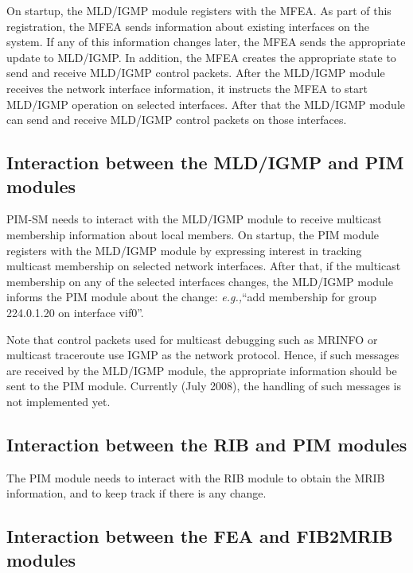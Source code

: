 \documentclass[11pt]{article}
\newcommand{\eg}{\emph{e.g.,}\xspace}
\begin{document}
On startup, the MLD/IGMP module registers with the MFEA. As part of this
registration, the MFEA sends information about existing
interfaces on the system. If
any of this information changes later, the MFEA sends the appropriate update
to MLD/IGMP. In addition, the MFEA creates the appropriate state to send and
receive MLD/IGMP control packets. After the MLD/IGMP module receives the
network interface information, it instructs the MFEA to start MLD/IGMP
operation on selected interfaces. After that the MLD/IGMP module can send and
receive MLD/IGMP control packets on those interfaces.

\subsection{Interaction between the MLD/IGMP and PIM modules}

PIM-SM needs to interact with the MLD/IGMP module to receive multicast
membership information about local members. On startup, the PIM module
registers with the MLD/IGMP module by expressing interest in tracking
multicast membership on selected network interfaces. After that, if
the multicast membership on any of the selected interfaces changes, the
MLD/IGMP module informs the PIM module about the change: \eg ``add
membership for group 224.0.1.20 on interface vif0''.

Note that control packets used for multicast debugging such as MRINFO or
multicast traceroute use IGMP as the network protocol. Hence, if such
messages are received by the MLD/IGMP module, the appropriate
information should be sent to the PIM module. Currently (July 2008),
the handling of such messages is not implemented yet.

\subsection{Interaction between the RIB and PIM modules}

The PIM module needs to interact with the RIB module to obtain the MRIB
information, and to keep track if there is any change.

\subsection{Interaction between the FEA and FIB2MRIB modules}
\label{sec:fea-to-fib2mrib-interaction}
\end{document}
